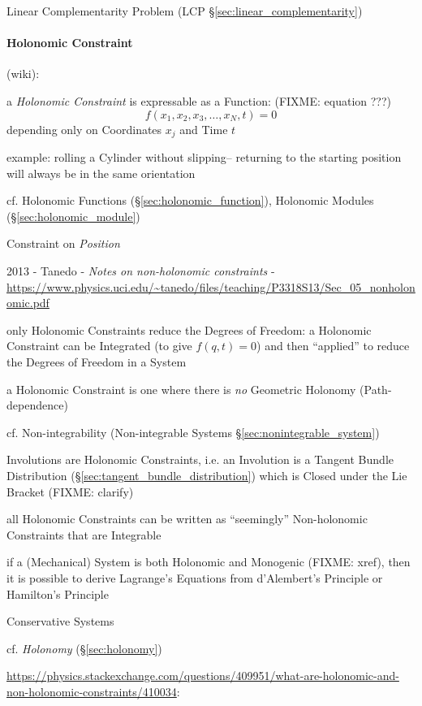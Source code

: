 \fist Linear Complementarity Problem (LCP \S\ref{sec:linear_complementarity})



\paragraph{Holonomic Constraint}\label{sec:holonomic_constraint}\hfill

(wiki):

a \emph{Holonomic Constraint} is expressable as a Function: (FIXME: equation
???)
\[
  f(x_1, x_2, x_3, \ldots, x_N, t) = 0
\]
depending only on Coordinates $x_j$ and Time $t$

example: rolling a Cylinder without slipping-- returning to the starting
position will always be in the same orientation

\fist cf. Holonomic Functions (\S\ref{sec:holonomic_function}), Holonomic
Modules (\S\ref{sec:holonomic_module})

Constraint on \emph{Position}

\asterism

2013 - Tanedo - \emph{Notes on non-holonomic constraints} -
\url{https://www.physics.uci.edu/~tanedo/files/teaching/P3318S13/Sec_05_nonholonomic.pdf}

only Holonomic Constraints reduce the Degrees of Freedom: a Holonomic
Constraint can be Integrated (to give $f(q, t) = 0$) and then ``applied'' to
reduce the Degrees of Freedom in a System

a Holonomic Constraint is one where there is \emph{no} Geometric Holonomy
(Path-dependence)

cf. Non-integrability (Non-integrable Systems \S\ref{sec:nonintegrable_system})

Involutions are Holonomic Constraints, i.e. an Involution is a Tangent Bundle
Distribution (\S\ref{sec:tangent_bundle_distribution}) which is Closed under
the Lie Bracket (FIXME: clarify)

all Holonomic Constraints can be written as ``seemingly'' Non-holonomic
Constraints that are Integrable

\asterism

if a (Mechanical) System is both Holonomic and Monogenic (FIXME: xref), then it
is possible to derive Lagrange's Equations from d'Alembert's Principle or
Hamilton's Principle

Conservative Systems

cf. \emph{Holonomy} (\S\ref{sec:holonomy})

\url{https://physics.stackexchange.com/questions/409951/what-are-holonomic-and-non-holonomic-constraints/410034}:

